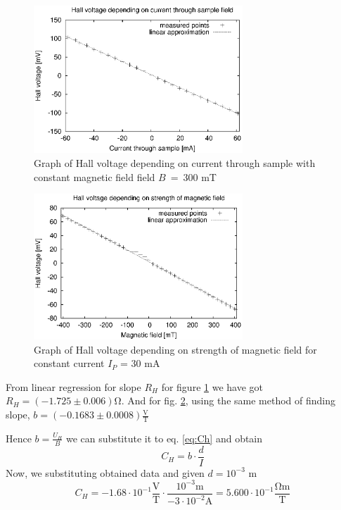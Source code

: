 \documentclass[a4paper,12pt]{article}
\begin{document}
    \begin{figure}[H]
        \begin{center}
            \includegraphics[width=0.70\textwidth]{U_H-vs-I_P}
            \caption{Graph of Hall voltage depending on current through sample with constant magnetic field field $B$~=~300 mT}
            \label{fig:U_H-vs-I_P}
        \end{center}
    \end{figure}

    \begin{figure}[H]
        \begin{center}
            \includegraphics[width=0.70\textwidth]{U_H-vs-B}
            \caption{Graph of Hall voltage depending on strength of magnetic field for constant current $I_P$ = 30 mA}
            \label{fig:U_H-vs-B}
        \end{center}
    \end{figure}

    From linear regression for slope $R_H$ for figure \ref{fig:U_H-vs-I_P} we have got $R_H = (-1.725 \pm 0.006) \mathrm{\Omega}$. And for fig. \ref{fig:U_H-vs-B}, using the same method of finding slope, $b = (-0.1683 \pm 0.0008) \frac{\mathrm{V}}{\mathrm{T}}$

    Hence $b = \frac{U_H}{B}$ we can substitute it to eq. \ref{eq:Ch} and obtain
    \begin{equation}
        C_H = b \cdot \frac{d}{I}
    \end{equation}
    Now, we substituting obtained data and given $d = 10^{-3}$ m
    \begin{displaymath}
        C_H = -1.68 \cdot 10^{-1} \frac{\mathrm{V}}{\mathrm{T}} \cdot \frac{10^{-3} \mathrm{m}}{-3 \cdot 10^{-2} \mathrm{A}} = 5.600 \cdot 10^{-1} \frac{\mathrm{\Omega m}}{\mathrm{T}}
    \end{displaymath}
\end{document}
